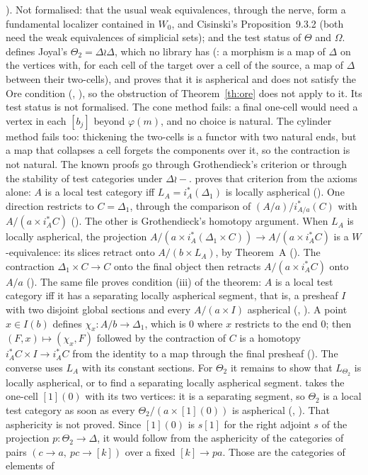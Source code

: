 ). Not formalised: that the usual weak equivalences, through the nerve, form a fundamental localizer contained in $W_0$, and Cisinski's Proposition~9.3.2 (both need the weak equivalences of simplicial sets); and the test status of $\Theta$ and $\Omega$.  defines Joyal's $\Theta_2=\Delta\wr\Delta$, which no library has (: a morphism is a map of $\Delta$ on the vertices with, for each cell of the target over a cell of the source, a map of $\Delta$ between their two-cells), and proves that it is aspherical and does not satisfy the Ore condition (, ), so the obstruction of Theorem~\ref{th:ore} does not apply to it. Its test status is not formalised. The cone method fails: a final one-cell would need a vertex in each $[b_j]$ beyond $\varphi(m)$, and no choice is natural. The cylinder method fails too: thickening the two-cells is a functor with two natural ends, but a map that collapses a cell forgets the components over it, so the contraction is not natural. The known proofs go through Grothendieck's criterion \cite[Th.~4.1.19]{cisinski-308} or through the stability of test categories under $\Delta\wr-$.  proves that criterion from the axioms alone: $A$ is a local test category iff $L_A=i_A^*(\Delta_1)$ is locally aspherical (). One direction restricts to $C=\Delta_1$, through the comparison of $(A/a)/i_{A/a}^*(C)$ with $A/(a\times i_A^*C)$ (). The other is Grothendieck's homotopy argument. When $L_A$ is locally aspherical, the projection $A/(a\times i_A^*(\Delta_1\times C))\to A/(a\times i_A^*C)$ is a $W$-equivalence: its slices retract onto $A/(b\times L_A)$, by Theorem~A (). The contraction $\Delta_1\times C\to C$ onto the final object then retracts $A/(a\times i_A^*C)$ onto $A/a$ (). The same file proves condition (iii) of the theorem: $A$ is a local test category iff it has a separating locally aspherical segment, that is, a presheaf $I$ with two disjoint global sections and every $A/(a\times I)$ aspherical (, ). A point $x\in I(b)$ defines $\chi_x\colon A/b\to\Delta_1$, which is $0$ where $x$ restricts to the end $0$; then $(F,x)\mapsto(\chi_x,F)$ followed by the contraction of $C$ is a homotopy $i_A^*C\times I\to i_A^*C$ from the identity to a map through the final presheaf (). The converse uses $L_A$ with its constant sections. For $\Theta_2$ it remains to show that $L_{\Theta_2}$ is locally aspherical, or to find a separating locally aspherical segment.  takes the one-cell $[1](0)$ with its two vertices: it is a separating segment, so $\Theta_2$ is a local test category as soon as every $\Theta_2/(a\times[1](0))$ is aspherical (, ). That asphericity is not proved. Since $[1](0)$ is $s[1]$ for the right adjoint $s$ of the projection $p\colon\Theta_2\to\Delta$, it would follow from the asphericity of the categories of pairs $(c\to a,\ p c\to[k])$ over a fixed $[k]\to p a$. Those are the categories of elements of 